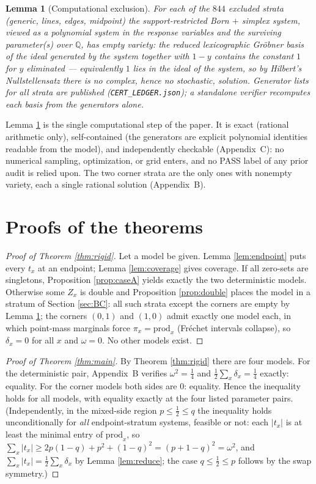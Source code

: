 \documentclass[11pt,a4paper]{article}
\newtheorem{lemma}{Lemma}
\newcommand{\dd}{\delta}
\begin{document}
\begin{lemma}[Computational exclusion]
\label{lem:cert}
For each of the $844$ excluded strata (generic, lines, edges, midpoint) the support-restricted Born $+$ simplex system, viewed as a polynomial system in the response variables and the surviving parameter(s) over $\mathbb{Q}$, has empty variety: the reduced lexicographic Gr\"obner basis of the ideal generated by the system together with $1-y$ contains the constant $1$ for $y$ eliminated --- equivalently $1$ lies in the ideal of the system, so by Hilbert's Nullstellensatz there is no complex, hence no stochastic, solution. Generator lists for all strata are published (\texttt{CERT\_LEDGER.json}); a standalone verifier recomputes each basis from the generators alone.
\end{lemma}
Lemma \ref{lem:cert} is the single computational step of the paper. It is exact (rational arithmetic only), self-contained (the generators are explicit polynomial identities readable from the model), and independently checkable (Appendix~C): no numerical sampling, optimization, or grid enters, and no PASS label of any prior audit is relied upon. The two corner strata are the only ones with nonempty variety, each a single rational solution (Appendix~B).

\section{Proofs of the theorems}
\begin{proof}[Proof of Theorem \ref{thm:rigid}]
Let a model be given. Lemma \ref{lem:endpoint} puts every $t_x$ at an endpoint; Lemma \ref{lem:coverage} gives coverage. If all zero-sets are singletons, Proposition \ref{prop:caseA} yields exactly the two deterministic models. Otherwise some $Z_x$ is double and Proposition \ref{prop:double} places the model in a stratum of Section \ref{sec:BC}: all such strata except the corners are empty by Lemma \ref{lem:cert}; the corners $(0,1)$ and $(1,0)$ admit exactly one model each, in which point-mass marginals force $\pi_x=\mathrm{prod}_x$ (Fr\'echet intervals collapse), so $\dd_x=0$ for all $x$ and $\omega=0$. No other models exist.
\end{proof}
\begin{proof}[Proof of Theorem \ref{thm:main}]
By Theorem \ref{thm:rigid} there are four models. For the deterministic pair, Appendix~B verifies $\omega^2=\tfrac14$ and $\tfrac12\sum_x\dd_x=\tfrac14$ exactly: equality. For the corner models both sides are $0$: equality. Hence the inequality holds for all models, with equality exactly at the four listed parameter pairs. (Independently, in the mixed-side region $p\le\tfrac12\le q$ the inequality holds unconditionally for \emph{all} endpoint-stratum systems, feasible or not: each $|t_x|$ is at least the minimal entry of $\mathrm{prod}_x$, so $\sum_x|t_x|\ge 2p(1-q)+p^2+(1-q)^2=(p+1-q)^2=\omega^2$, and $\sum_x|t_x|=\tfrac12\sum_x\dd_x$ by Lemma \ref{lem:reduce}; the case $q\le\tfrac12\le p$ follows by the swap symmetry.)
\end{proof}
\end{document}
